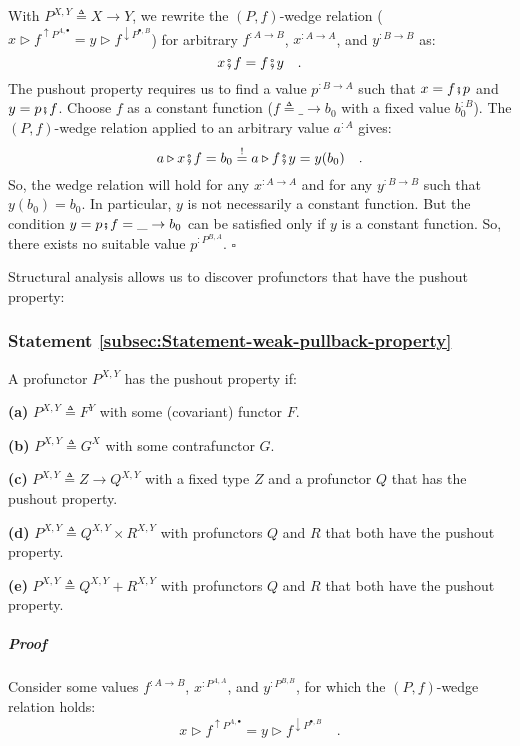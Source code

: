With $P^{X,Y}\triangleq X\rightarrow Y$, we rewrite the $\left(P,f\right)$-wedge
relation ($x\triangleright f^{\uparrow P^{A,\bullet}}=y\triangleright f^{\downarrow P^{\bullet,B}}$)
for arbitrary $f^{:A\rightarrow B}$, $x^{:A\rightarrow A}$, and
$y^{:B\rightarrow B}$ as:
\[
x\bef f=f\bef y\quad.
\]
The pushout property requires us to find a value $p^{:B\rightarrow A}$
such that $x=f\bef p$ and $y=p\bef f$. Choose $f$ as a constant
function ($f\triangleq\_\rightarrow b_{0}$ with a fixed value $b_{0}^{:B}$).
The $\left(P,f\right)$-wedge relation applied to an arbitrary value
$a^{:A}$ gives:
\[
a\triangleright x\bef f=b_{0}\overset{!}{=}a\triangleright f\bef y=y(b_{0})\quad.
\]
So, the wedge relation will hold for any $x^{:A\rightarrow A}$ and
for any $y^{:B\rightarrow B}$ such that $y(b_{0})=b_{0}$. In particular,
$y$ is not necessarily a constant function. But the condition $y=p\bef f=\_\rightarrow b_{0}$
can be satisfied only if $y$ is a constant function. So, there exists
no suitable value $p^{:P^{B,A}}$. $\square$

Structural analysis allows us to discover profunctors that have the
pushout property:

\subsubsection{Statement \label{subsec:Statement-weak-pullback-property}\ref{subsec:Statement-weak-pullback-property}}

A profunctor $P^{X,Y}$ has the pushout property if:

\textbf{(a)} $P^{X,Y}\triangleq F^{Y}$ with some (covariant) functor
$F$.

\textbf{(b)} $P^{X,Y}\triangleq G^{X}$ with some contrafunctor $G$.

\textbf{(c)} $P^{X,Y}\triangleq Z\rightarrow Q^{X,Y}$ with a fixed
type $Z$ and a profunctor $Q$ that has the pushout property.

\textbf{(d)} $P^{X,Y}\triangleq Q^{X,Y}\times R^{X,Y}$ with profunctors
$Q$ and $R$ that both have the pushout property.

\textbf{(e)} $P^{X,Y}\triangleq Q^{X,Y}+R^{X,Y}$ with profunctors
$Q$ and $R$ that both have the pushout property.

\subparagraph{Proof}

Consider some values $f^{:A\rightarrow B}$, $x^{:P^{A,A}}$, and
$y^{:P^{B,B}}$, for which the $\left(P,f\right)$-wedge relation
holds:
\[
x\triangleright f^{\uparrow P^{A,\bullet}}=y\triangleright f^{\downarrow P^{\bullet,B}}\quad.
\]

